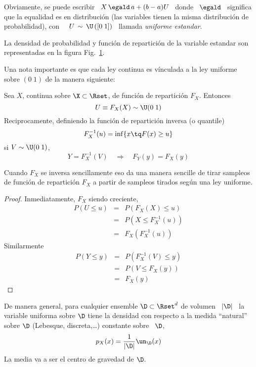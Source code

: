 Obviamente, se puede escribir \ $X \, \egald  \, a + (b-a) U$ \ donde \ $\egald$
\ significa que la equalidad es en distribuci\'on (las variables tienen la misma
distribuci\'on de probabilidad), con \ \ $U \, \sim \, \U \left( [ 0 \; 1 ]
\right)$ \ llamada {\em uniforme estandar}.

La densidad de probabilidad y funci\'on de repartici\'on de la variable estandar
son representadas en la figura Fig.~\ref{Fig:MP:Uniformecontinua}.
%
\begin{figure}[h!]
\begin{center}  \end{center}
% 
\label{Fig:MP:Uniformecontinua}
\end{figure}

Una nota  importante es que cada ley  continua es v\'inculada a  la ley uniforme
sobre $(0 \; 1)$ de la manera siguiente:
%
\begin{lema}[Inversi\'on]\label{Lem:MP:InversionUniforme}
Sea $X$, continua sobre $\X \subset \Rset$, de funci\'on de repartici\'on $F_X$. Entonces
%
\[
U \equiv F_X(X) \sim \U(0 \; 1)
\]
%
Reciprocamente, definiendo la funci\'on de repartici\'on inversa (o quantile)
%
\[
F_X^{-1}(u) = \inf \{ x \tq F(x) \ge u \}
\]
%
si $V \sim \U( 0 \; 1 )$,
%
\[
Y = F_X^{-1}(V) \quad \Rightarrow \quad F_Y(y) = F_X(y)
\]
\end{lema}
%
Cuando  $F_X$ se  inversa  sencillamente eso  da  una manera  sencille de  tirar
sampleos de funci\'on de repartici\'on $F_X$ a partir de sampleos tirados seg\'un
una ley uniforme.
%
\begin{proof}
Inmediatamente, $F_X$ siendo creciente,
%
\begin{eqnarray*}
P(U \le u) & = &  P( F_X(X) \le u)\\[2mm]
%
& = & P(X \le F_X^{-1}(u))\\[2mm]
%
& = & F_X\left( F_X^{-1} (u) \right)
\end{eqnarray*}
%
Similarmente
%
\begin{eqnarray*}
P(Y \le y) & = &  P( F_X^{-1}(V) \le y)\\[2mm]
%
& = & P(V \le F_X(y))\\[2mm]
%
& = & F_X(y)
\end{eqnarray*}
%
\end{proof}

De manera  general, para  cualquier ensemble $\D  \subset \Rset^d$ de  volumen \
$|\D|$ \,  la variable uniforma sobre $\D$  tiene la densidad con  respecto a la
medida  ``natural'' sobre  $\D$  (Lebesque, discreta,\ldots)  constante sobre  \
$\D$,
%
\[
p_X(x) = \frac{1}{|\D|} \un_{\D}(x)
\]
%
La media va a ser el centro de gravedad de $\D$.

